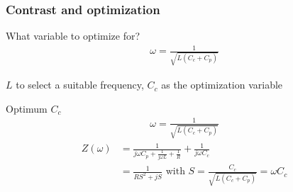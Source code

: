 \documentclass[../main.tex]{subfiles}
\begin{document}
\subsubsection{Contrast and optimization}

\begin{frame}{What variable to optimize for?}
\begin{align*}
    \omega = \frac{1}{\sqrt{L(C_{c} + C_{p})}}
\end{align*}
\begin{center}
    \(L\) to select a suitable frequency, \(C_{c}\) as the optimization
    variable
\end{center}
\end{frame}

\begin{frame}{Optimum \(C_{c}\)}
\begin{align*}
    \omega = \frac{1}{\sqrt{L(C_{c} + C_{p})}}
\end{align*}
\begin{align*}
    Z(\omega) &= \frac{1}{j \omega C_{p} + \frac{1}{j \omega L} + \frac{1}{R}} + \frac{1}{j \omega C_{c}}\\
              &= \frac{1}{RS^2 + jS}
       \text{ with } S = \frac{C_{c}}{\sqrt{L(C_{c} + C_{p})}} = \omega C_{c}
\end{align*}
\end{frame}

%
%
%
%
\end{document}
